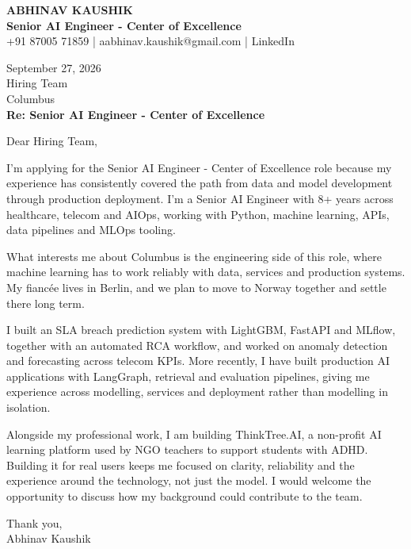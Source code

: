 \documentclass[10pt,a4paper]{article}
\begin{document}
\begin{center}
{\Large\bfseries ABHINAV KAUSHIK}\\[2pt]
{\bfseries Senior AI Engineer - Center of Excellence}\\[2pt]
+91 87005 71859 \quad | \quad aabhinav.kaushik@gmail.com \quad | \quad LinkedIn
\end{center}
\vspace{8pt}
September 27, 2026\\[6pt]
Hiring Team\\
Columbus\\[4pt]
\textbf{Re: Senior AI Engineer - Center of Excellence}

Dear Hiring Team,

I’m applying for the Senior AI Engineer - Center of Excellence role because my experience has consistently covered the path from data and model development through production deployment. I’m a Senior AI Engineer with 8+ years across healthcare, telecom and AIOps, working with Python, machine learning, APIs, data pipelines and MLOps tooling.

What interests me about Columbus is the engineering side of this role, where machine learning has to work reliably with data, services and production systems. My fiancée lives in Berlin, and we plan to move to Norway together and settle there long term.

I built an SLA breach prediction system with LightGBM, FastAPI and MLflow, together with an automated RCA workflow, and worked on anomaly detection and forecasting across telecom KPIs. More recently, I have built production AI applications with LangGraph, retrieval and evaluation pipelines, giving me experience across modelling, services and deployment rather than modelling in isolation.

Alongside my professional work, I am building ThinkTree.AI, a non-profit AI learning platform used by NGO teachers to support students with ADHD. Building it for real users keeps me focused on clarity, reliability and the experience around the technology, not just the model. I would welcome the opportunity to discuss how my background could contribute to the team.

Thank you,\\
Abhinav Kaushik
\end{document}
